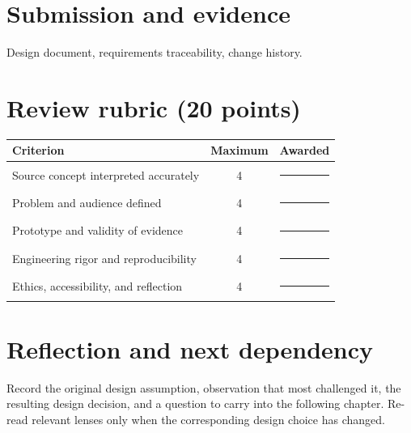 \documentclass[11pt]{article}
\begin{document}
\section{Submission and evidence}
Design document, requirements traceability, change history.


\section{Review rubric (20 points)}
\begin{tabularx}{\linewidth}{@{}Xcc@{}}\toprule
Criterion & Maximum & Awarded \\ \midrule
Source concept interpreted accurately & 4 & \rule{0.45in}{0.4pt}\\
Problem and audience defined & 4 & \rule{0.45in}{0.4pt}\\
Prototype and validity of evidence & 4 & \rule{0.45in}{0.4pt}\\
Engineering rigor and reproducibility & 4 & \rule{0.45in}{0.4pt}\\
Ethics, accessibility, and reflection & 4 & \rule{0.45in}{0.4pt}\\\bottomrule
\end{tabularx}

\section{Reflection and next dependency}
Record the original design assumption, observation that most challenged it, the resulting design decision, and a question to carry into the following chapter. Re-read relevant lenses only when the corresponding design choice has changed.
\end{document}
